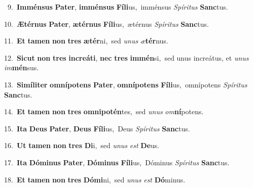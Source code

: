 {{\numbfont\textcolor{\numbcolor}{~9.}}~\-\textbf{Im}\-\textbf{mén}\textbf{sus} \textbf{Pa}\-\textbf{ter}, \textbf{im}\-\textbf{mén}\textbf{sus} \textbf{Fí}\-\textbf{li}us,~\star imménsus \textit{Spí}\-\textit{ri}\textit{tus} \textbf{Sanc}\-tus.\par
{\numbfont\textcolor{\numbcolor}{10.}}~\-\textbf{Æ}\-\textbf{tér}\textbf{nus} \textbf{Pa}\-\textbf{ter}, \textbf{æ}\-\textbf{tér}\textbf{nus} \textbf{Fí}\-\textbf{li}us,~\star ætérnus \textit{Spí}\-\textit{ri}\textit{tus} \textbf{Sanc}\-tus.\par
{\numbfont\textcolor{\numbcolor}{11.}}~\textbf{Et} \textbf{ta}\-\textbf{men} \textbf{non} \textbf{tres} \textbf{æ}\-\textbf{tér}ni,~\star sed \textit{u}\-\textit{nus} \textit{æ}\-\textbf{tér}nus.\par
{\numbfont\textcolor{\numbcolor}{12.}}~\-\textbf{Sic}\-\textbf{ut} \textbf{non} \textbf{tres} \textbf{in}\-\textbf{cre}\textbf{á}\textbf{ti}, \textbf{nec} \textbf{tres} \textbf{im}\-\textbf{mén}si,~\star sed unus increátus, et \textit{u}\-\textit{nus} \textit{im}\-\textbf{mén}sus.\par
{\numbfont\textcolor{\numbcolor}{13.}}~\-\textbf{Si}\-\textbf{mí}\textbf{li}\textbf{ter} \textbf{om}\-\textbf{ní}\textbf{pot}\textbf{ens} \textbf{Pa}\-\textbf{ter}, \textbf{om}\-\textbf{ní}\textbf{pot}\textbf{ens} \textbf{Fí}\-\textbf{li}us,~\star omnípotens \textit{Spí}\-\textit{ri}\textit{tus} \textbf{Sanc}\-tus.\par
{\numbfont\textcolor{\numbcolor}{14.}}~\textbf{Et} \textbf{ta}\-\textbf{men} \textbf{non} \textbf{tres} \textbf{om}\-\textbf{ni}\textbf{pot}\textbf{én}tes,~\star sed \textit{u}\-\textit{nus} \textit{om}\-\textbf{ní}potens.\par
{\numbfont\textcolor{\numbcolor}{15.}}~\-\textbf{I}\-\textbf{ta} \textbf{De}\-\textbf{us} \textbf{Pa}\-\textbf{ter}, \textbf{De}\-\textbf{us} \textbf{Fí}\-\textbf{li}us,~\star Deus \textit{Spí}\-\textit{ri}\textit{tus} \textbf{Sanc}\-tus.\par
{\numbfont\textcolor{\numbcolor}{16.}}~\textbf{Ut} \textbf{ta}\-\textbf{men} \textbf{non} \textbf{tres} \textbf{Di}\-i,~\star sed \textit{u}\-\textit{nus} \textit{est} \textbf{De}\-us.\par
{\numbfont\textcolor{\numbcolor}{17.}}~\-\textbf{I}\-\textbf{ta} \textbf{Dó}\-\textbf{mi}\textbf{nus} \textbf{Pa}\-\textbf{ter}, \textbf{Dó}\-\textbf{mi}\textbf{nus} \textbf{Fí}\-\textbf{li}us,~\star Dóminus \textit{Spí}\-\textit{ri}\textit{tus} \textbf{Sanc}\-tus.\par
{\numbfont\textcolor{\numbcolor}{18.}}~\textbf{Et} \textbf{ta}\-\textbf{men} \textbf{non} \textbf{tres} \textbf{Dó}\-\textbf{mi}ni,~\star sed \textit{u}\-\textit{nus} \textit{est} \textbf{Dó}\-minus.\par
}
